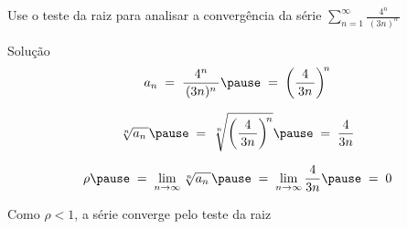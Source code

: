 \begin{question}
  Use o teste da raiz para analisar a convergência da série
  \(
    \sum_{n=1}^\infty \frac{4^n}{\,(3n)^n\,}
  \)
\end{question}

\begin{resolution}{Solução}
  \[
    a_n
    \;=\; \frac{4^n}{\,(3n)^n\,}
    \pause
    \;=\; \left(\frac{4}{\,3n\,}\right)^{\!n}
  \]

  \pause
  \[
    \sqrt[n]{a_n\,}
    \pause
    \;=\; \sqrt[n]{\left(\frac{4}{\,3n\,}\right)^{\!n}}
    \pause
    \;=\; \frac{4}{3n}
  \]

  \pause
  \[
    \rho
    \pause
    \;=\; \lim_{n\to \infty} \sqrt[n]{a_n\,}
    \pause
    \;=\; \lim_{n\to \infty} \frac{4}{3n}
    \pause
    \;=\; 0
  \]

  Como \(\rho < 1\),
  \pause
  a série converge pelo teste da raiz
\end{resolution}
